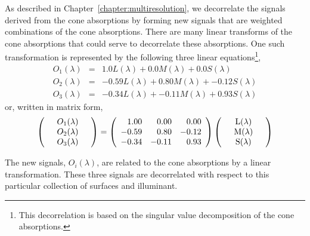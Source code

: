 As described in Chapter~\ref{chapter:multiresolution}, we decorrelate
the signals derived from the cone absorptions by forming new signals
that are weighted combinations of the cone absorptions.  There are
many linear transforms of the cone absorptions that could serve to
decorrelate these absorptions.  One such transformation is represented
by the following three linear equations\footnote{ This decorrelation
is based on the singular value decomposition of the cone absorptions.
},
\begin{eqnarray}
O_1(\lambda) & = &  1.0L(\lambda) +  0.0M(\lambda) + 0.0S(\lambda) 
 \nonumber \\
O_2(\lambda) & = & -0.59L(\lambda) + 0.80M(\lambda) + -0.12S(\lambda) 
 \nonumber \\
O_3(\lambda) & = &  -0.34L(\lambda) + -0.11M(\lambda) + 0.93S(\lambda)
\label{e8:decor}
\end{eqnarray}
or, written in matrix form, 
\begin{equation}
\left (
 \begin{array}{ccc}
   & O_1(\lambda) & \\
   & O_2(\lambda) & \\
   & O_3(\lambda) & \\
 \end{array} \right ) =
\left (
 \begin{array}{rrr}
     1.00  &  0.00 &  0.00 \\
    -0.59  &  0.80 & -0.12 \\
    -0.34  & -0.11 &  0.93 \\
 \end{array}
\right )
\left (
 \begin{array}{ccc}
   & \mbox{L}(\lambda) & \\
   & \mbox{M}(\lambda) & \\
   & \mbox{S}(\lambda) & \\
 \end{array}
\right ) \nonumber
\label{e8:decor2}
\end{equation}

The new signals, $O_i(\lambda)$, are related to the cone absorptions
by a linear transformation.  These three signals are decorrelated with
respect to this particular collection of surfaces and illuminant.

